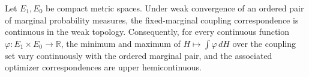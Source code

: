 Let \(E_1,E_0\) be compact metric spaces.  Under weak convergence of an ordered pair of marginal probability measures, the fixed-marginal coupling correspondence is continuous in the weak topology.  Consequently, for every continuous function \(\varphi:E_1\times E_0\to\mathbb R\), the minimum and maximum of \(H\mapsto\int\varphi\,dH\) over the coupling set vary continuously with the ordered marginal pair, and the associated optimizer correspondences are upper hemicontinuous.